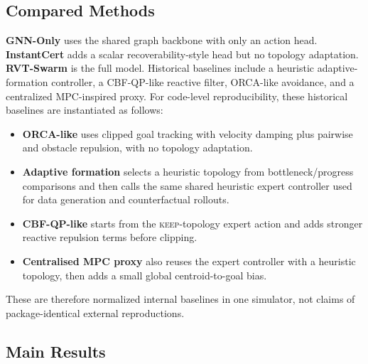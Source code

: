 \documentclass{ieeeaccess}
\begin{document}
\subsection{Compared Methods}
\textbf{GNN-Only} uses the shared graph backbone with only an action head. \textbf{InstantCert} adds a scalar recoverability-style head but no topology adaptation. \textbf{RVT-Swarm} is the full model. Historical baselines include a heuristic adaptive-formation controller, a CBF-QP-like reactive filter, ORCA-like avoidance, and a centralized MPC-inspired proxy. For code-level reproducibility, these historical baselines are instantiated as follows:
\begin{itemize}
    \item \textbf{ORCA-like} uses clipped goal tracking with velocity damping plus pairwise and obstacle repulsion, with no topology adaptation.
    \item \textbf{Adaptive formation} selects a heuristic topology from bottleneck/progress comparisons and then calls the same shared heuristic expert controller used for data generation and counterfactual rollouts.
    \item \textbf{CBF-QP-like} starts from the \textsc{keep}-topology expert action and adds stronger reactive repulsion terms before clipping.
    \item \textbf{Centralised MPC proxy} also reuses the expert controller with a heuristic topology, then adds a small global centroid-to-goal bias.
\end{itemize}
These are therefore normalized internal baselines in one simulator, not claims of package-identical external reproductions.

\subsection{Main Results}
\label{sec:main_results}
\end{document}
